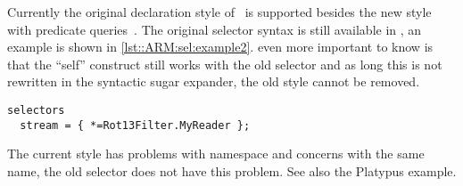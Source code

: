 Currently the original declaration
style of~\cite{salinas:ms01} is supported besides the new style with predicate queries~\cite{Havinga2005}.
The original selector syntax is still available in \Compose*,
an example is shown in \autoref{lst::ARM:sel:example2}.
even more important to know is that the ``self'' construct still works with the old selector and as long this is not rewritten in the syntactic sugar expander, the old style cannot be removed.
\begin{lstlisting}[caption={An example of the old style selector}, label = lst::ARM:sel:example2,
style=listing, language =ComposeStar, float = tpb]
selectors
  stream = { *=Rot13Filter.MyReader };
\end{lstlisting}

The current style has problems with namespace and concerns with the same name, the old selector does not have this problem. See also the Platypus example.